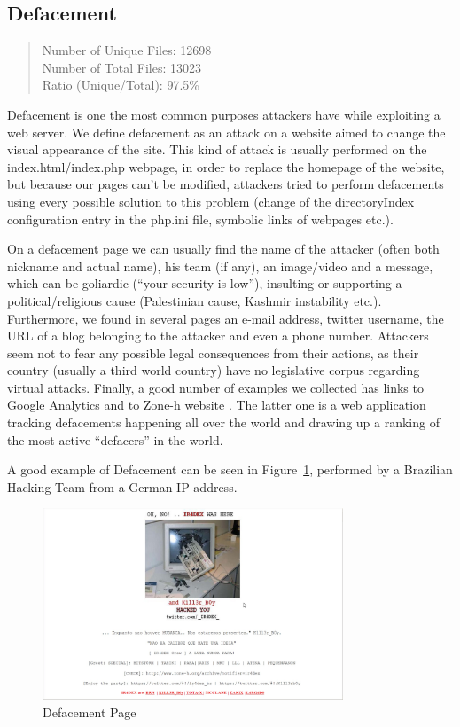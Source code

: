 \subsection{Defacement}

\begin{quote}
Number of Unique Files: 12698\\
Number of Total Files: 13023\\
Ratio (Unique/Total): 97.5\%
\end{quote}

Defacement is one the most common purposes attackers have while exploiting a web server. We define defacement as an attack on a website aimed to change the visual appearance of the site. This kind of attack is usually performed on the index.html/index.php webpage, in order to replace the homepage of the website, but because our pages can't be modified, attackers tried to perform defacements using every possible solution to this problem (change of the directoryIndex configuration entry in the php.ini file, symbolic links of webpages etc.).

On a defacement page we can usually find the name of the attacker (often both nickname and actual name), his team (if any), an image/video and a message, which can be goliardic (``your security is low''), insulting or supporting a political/religious cause (Palestinian cause, Kashmir instability etc.). Furthermore, we found in several pages an e-mail address, twitter username, the URL of a blog belonging to the attacker and even a phone number. Attackers seem not to fear any possible legal consequences from their actions, as their country (usually a third world country) have no legislative corpus regarding virtual attacks. Finally, a good number of examples we collected has links to Google Analytics and to Zone-h website \cite{zoneh}. The latter one is a web application tracking defacements happening all over the world and drawing up a ranking of the most active ``defacers'' in the world.

A good example of Defacement can be seen in Figure~\ref{fig:defacement}, performed by a Brazilian Hacking Team from a German IP address.

\begin{figure}[H]
\centerline{\includegraphics[width=0.8\textwidth]{Images/defacement.jpg}}
\caption{Defacement Page\label{fig:defacement}}
\end{figure}

